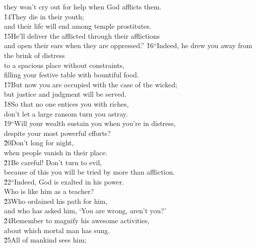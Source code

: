 \begin{poetry}
\poemll    they won't cry out for help when God afflicts them. \\
\poeml \v{14}They die in their youth; \\
\poemll    and their life will end among temple prostitutes. \\
\poeml \v{15}He'll deliver the afflicted through their afflictions \\
\poemll    and open their ears when they are oppressed.''
\poeml \v{16}``Indeed, he drew you away from the brink of distress \\
\poemll    to a spacious place without constraints, \\
\poemlll       filling your festive table with bountiful food. \\
\poeml \v{17}But now you are occupied with the case of the wicked; \\
\poemll    but justice and judgment will be served. \\
\poeml \v{18}So that no one entices you with riches, \\
\poemll    don't let a large ransom turn you astray. \\
\poeml \v{19}``Will your wealth sustain you when you're in distress, \\
\poemll    despite your most powerful efforts? \\
\poeml \v{20}Don't long for night, \\
\poemll    when people vanish in their place. \\
\poeml \v{21}Be careful! Don't turn to evil, \\
\poemll    because of this you will be tried by more than affliction. \\
\poeml \v{22}``Indeed, God is exalted in his power. \\
\poemll    Who is like him as a teacher? \\
\poeml \v{23}Who ordained his path for him, \\
\poemll    and who has asked him, `You are wrong, aren't you?' \\
\poeml \v{24}Remember to magnify his awesome activities, \\
\poemll    about which mortal man has sung. \\
\poeml \v{25}All of mankind sees him; \\

\end{poetry}
